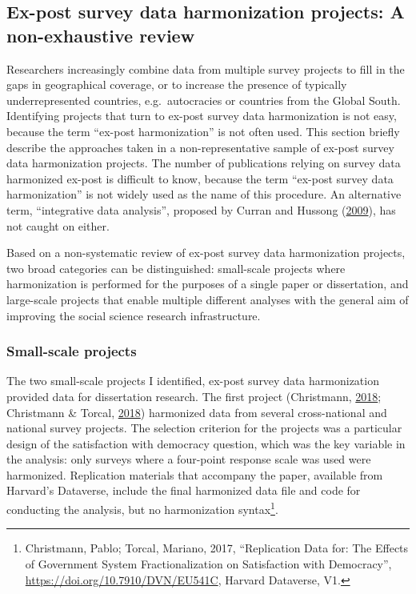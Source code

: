\documentclass[12pt,]{article}
\let\rmarkdownfootnote\footnote%
\def\footnote{\protect\rmarkdownfootnote}
\begin{document}
\hypertarget{ex-post-survey-data-harmonization-projects-a-non-exhaustive-review}{%
\subsection{Ex-post survey data harmonization projects: A non-exhaustive review}\label{ex-post-survey-data-harmonization-projects-a-non-exhaustive-review}}

Researchers increasingly combine data from multiple survey projects to fill in the gaps in geographical coverage, or to increase the presence of typically underrepresented countries, e.g.~autocracies or countries from the Global South. Identifying projects that turn to ex-post survey data harmonization is not easy, because the term ``ex-post harmonization'' is not often used. This section briefly describe the approaches taken in a non-representative sample of ex-post survey data harmonization projects. The number of publications relying on survey data harmonized ex-post is difficult to know, because the term ``ex-post survey data harmonization'' is not widely used as the name of this procedure. An alternative term, ``integrative data analysis'', proposed by Curran and Hussong (\protect\hyperlink{ref-Curran2009}{2009}), has not caught on either.

Based on a non-systematic review of ex-post survey data harmonization projects, two broad categories can be distinguished: small-scale projects where harmonization is performed for the purposes of a single paper or dissertation, and large-scale projects that enable multiple different analyses with the general aim of improving the social science research infrastructure.

\hypertarget{small-scale-projects}{%
\subsubsection{Small-scale projects}\label{small-scale-projects}}

The two small-scale projects I identified, ex-post survey data harmonization provided data for dissertation research. The first project (Christmann, \protect\hyperlink{ref-Christmann2018}{2018}; Christmann \& Torcal, \protect\hyperlink{ref-Christmann2018a}{2018}) harmonized data from several cross-national and national survey projects. The selection criterion for the projects was a particular design of the satisfaction with democracy question, which was the key variable in the analysis: only surveys where a four-point response scale was used were harmonized. Replication materials that accompany the paper, available from Harvard's Dataverse, include the final harmonized data file and code for conducting the analysis, but no harmonization syntax\footnote{Christmann, Pablo; Torcal, Mariano, 2017, ``Replication Data for: The Effects of Government System Fractionalization on Satisfaction with Democracy'', \url{https://doi.org/10.7910/DVN/EU541C}, Harvard Dataverse, V1.}.
\end{document}
